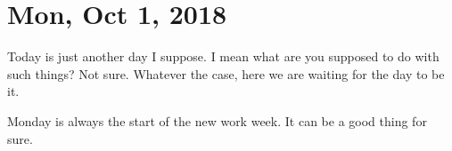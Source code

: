\section{Mon, Oct 1, 2018}

Today is just another day I suppose. I mean what are you supposed to do
with such things? Not sure. Whatever the case, here we are waiting for
the day to be it.

Monday is always the start of the new work week. It can be a good thing
for sure.
